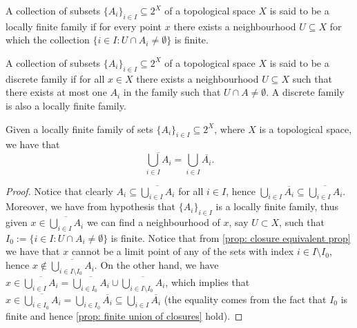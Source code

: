 \begin{definition}
  A collection of subsets \(\{A_i\}_{i \in I} \subseteq 2^X\) of a topological
  space \(X\) is said to be a locally finite family if for every point \(x\)
  there exists a neighbourhood \(U \subseteq X\) for which the collection \(\{i
  \in I: U \cap A_i \neq \emptyset\}\) is finite.
\end{definition}

\begin{definition}
  A collection of subsets \(\{A_i\}_{i \in I} \subseteq 2^X\) of a topological
  space \(X\) is said to be a discrete family if for all \(x \in X\) there
  exists a neighbourhood \(U \subseteq X\) such that there exists at most one
  \(A_i\) in the family such that \(U \cap A \neq \emptyset\). A discrete family
  is also a locally finite family.
\end{definition}

\begin{proposition}
  Given a locally finite family of sets \(\{A_i\}_{i \in I} \subseteq 2^X\),
  where \(X\) is a topological space, we have that
  \[
    \overline{\bigcup_{i \in  I} A_i} = \bigcup_{i \in  I} \overline{A_i}.
  \] 
\end{proposition}

\begin{proof}
  Notice that clearly \(A_i \subseteq \overline{\bigcup_{i \in  I} A_i}\) for
  all \(i \in I\), hence \(\bigcup_{i \in  I} \overline{A_i} \subseteq
  \overline{\bigcup_{i \in I} A_i}\). Moreover, we have from hypothesis that
  \(\{A_i\}_{i \in I}\) is a locally finite family, thus given \(x \in
  \overline{\bigcup_{i \in  I} A_i}\) we can find a neighbourhood of \(x\), say
  \(U \subset X\), such that \(I_0 := \{i \in I : U \cap A_i \neq \emptyset\}\) 
  is finite. Notice that from \cref{prop: closure equivalent prop} we have that
  \(x\) cannot be a limit point of any of the sets with index \(i \in I
  \setminus I_0\), hence \(x \not\in \overline{\bigcup_{i \in  I \setminus I_0}
  A_i}\). On the other hand, we have \(x \in \overline{\bigcup_{i \in  I} A_i} =
  \overline{\bigcup_{i \in  I_0} A_i} \cup \overline{\bigcup_{i \in  I \setminus
  I_0} A_i}\), which implies that \(x \in \overline{\bigcup_{i \in  I_0} A_i} =
  \bigcup_{i \in  I_0} \overline{A_i} \subseteq \bigcup_{i \in  I}
  \overline{A_i}\) (the equality comes from the fact that \(I_0\) is finite and
  hence \cref{prop: finite union of closures} hold).
\end{proof}

